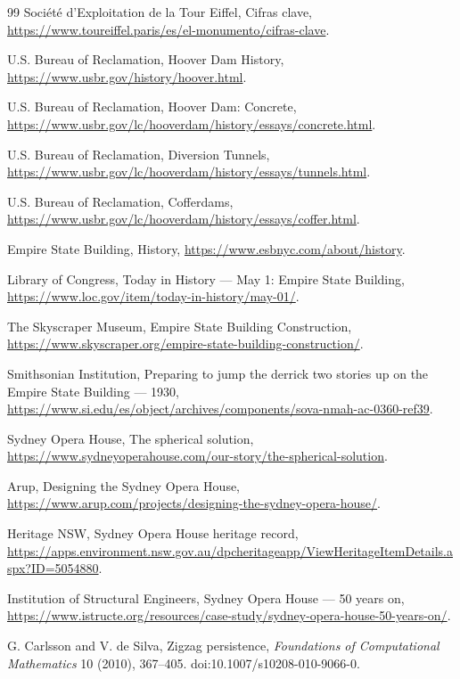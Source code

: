 \begin{thebibliography}{99}
Société d'Exploitation de la Tour Eiffel,
Cifras clave,
\url{https://www.toureiffel.paris/es/el-monumento/cifras-clave}.

U.S. Bureau of Reclamation,
Hoover Dam History,
\url{https://www.usbr.gov/history/hoover.html}.

U.S. Bureau of Reclamation,
Hoover Dam: Concrete,
\url{https://www.usbr.gov/lc/hooverdam/history/essays/concrete.html}.

U.S. Bureau of Reclamation,
Diversion Tunnels,
\url{https://www.usbr.gov/lc/hooverdam/history/essays/tunnels.html}.

U.S. Bureau of Reclamation,
Cofferdams,
\url{https://www.usbr.gov/lc/hooverdam/history/essays/coffer.html}.

Empire State Building,
History,
\url{https://www.esbnyc.com/about/history}.

Library of Congress,
Today in History --- May 1: Empire State Building,
\url{https://www.loc.gov/item/today-in-history/may-01/}.

The Skyscraper Museum,
Empire State Building Construction,
\url{https://www.skyscraper.org/empire-state-building-construction/}.

Smithsonian Institution,
Preparing to jump the derrick two stories up on the Empire State Building --- 1930,
\url{https://www.si.edu/es/object/archives/components/sova-nmah-ac-0360-ref39}.

Sydney Opera House,
The spherical solution,
\url{https://www.sydneyoperahouse.com/our-story/the-spherical-solution}.

Arup,
Designing the Sydney Opera House,
\url{https://www.arup.com/projects/designing-the-sydney-opera-house/}.

Heritage NSW,
Sydney Opera House heritage record,
\url{https://apps.environment.nsw.gov.au/dpcheritageapp/ViewHeritageItemDetails.aspx?ID=5054880}.

Institution of Structural Engineers,
Sydney Opera House --- 50 years on,
\url{https://www.istructe.org/resources/case-study/sydney-opera-house-50-years-on/}.


G. Carlsson and V. de Silva,
Zigzag persistence,
\emph{Foundations of Computational Mathematics} 10 (2010), 367--405.
doi:10.1007/s10208-010-9066-0.


\end{thebibliography}
